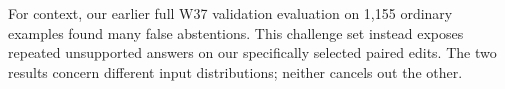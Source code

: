 \documentclass[10pt,a4paper]{article}
\begin{document}
For context, our earlier full W37 validation evaluation on 1,155 ordinary examples found many false abstentions. This challenge set instead exposes repeated unsupported answers on our specifically selected paired edits. The two results concern different input distributions; neither cancels out the other.
\end{document}
